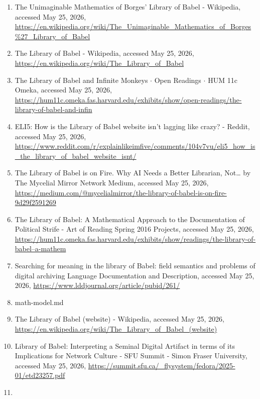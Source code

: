 \documentclass[
  11pt,
  a4paper,
]{article}
\begin{document}
\begin{enumerate}
\def\labelenumi{\arabic{enumi}.}
\item
  The Unimaginable Mathematics of Borges' Library of Babel - Wikipedia, accessed May 25, 2026,
  \url{https://en.wikipedia.org/wiki/The_Unimaginable_Mathematics_of_Borges\%27_Library_of_Babel}
\item
  The Library of Babel - Wikipedia, accessed May 25, 2026,
  \url{https://en.wikipedia.org/wiki/The_Library_of_Babel}
\item
  The Library of Babel and Infinite Monkeys $\cdot$ Open Readings $\cdot$ HUM 11c Omeka, accessed May 25, 2026,
  \url{https://hum11c.omeka.fas.harvard.edu/exhibits/show/open-readings/the-library-of-babel-and-infin}
\item
  ELI5: How is the Library of Babel website isn't lagging like crazy? - Reddit, accessed May 25, 2026,
  \url{https://www.reddit.com/r/explainlikeimfive/comments/104v7vu/eli5_how_is_the_library_of_babel_website_isnt/}
\item
  The Library of Babel is on Fire. Why AI Needs a Better Librarian, Not\ldots{} \textbar{} by The Mycelial Mirror Network \textbar{} Medium, accessed May 25, 2026,
  \href{https://medium.com/@mycelialmirror/the-library-of-babel-is-on-fire-9d29f2591269}{https://medium.com/@mycelialmirror/the-library-of-babel-is-on-fire-9d29f2591269}
\item
  The Library of Babel: A Mathematical Approach to the Documentation of Political Strife - Art of Reading Spring 2016 Projects, accessed May 25, 2026,
  \href{https://hum11c.omeka.fas.harvard.edu/exhibits/show/readings/the-library-of-babel--a-mathem}{https://hum11c.omeka.fas.harvard.edu/exhibits/show/readings/the-library-of-babel--a-mathem}
\item
  Searching for meaning in the library of Babel: field semantics and problems of digital archiving \textbar{} Language Documentation and Description, accessed May 25, 2026,
  \url{https://www.lddjournal.org/article/pubid/261/}
\item
  math-model.md
\item
  The Library of Babel (website) - Wikipedia, accessed May 25, 2026,
  \url{https://en.wikipedia.org/wiki/The_Library_of_Babel_(website)}
\item
  Library of Babel: Interpreting a Seminal Digital Artifact in terms of its Implications for Network Culture - SFU Summit - Simon Fraser University, accessed May 25, 2026,
  \url{https://summit.sfu.ca/_flysystem/fedora/2025-01/etd23257.pdf}
\item

\end{enumerate}
\end{document}
